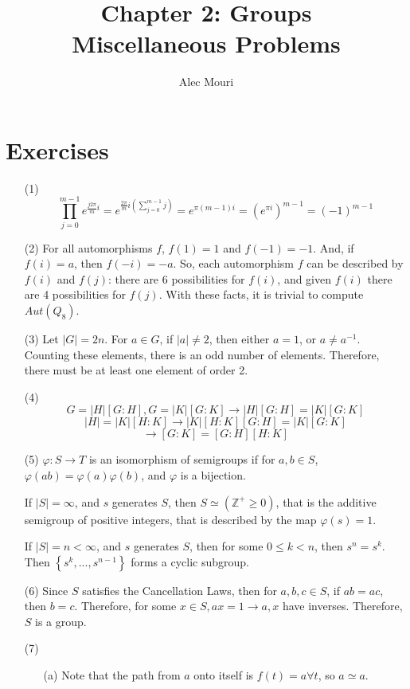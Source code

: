 \documentclass[12pt]{article}
\begin{document}
\title{Chapter 2: Groups \\ Miscellaneous Problems}
\author{Alec Mouri}

\maketitle
\section*{Exercises}
\begin{itemize}
\item[(1)]
$$\prod_{j = 0}^{m-1} e^{\frac{j2\pi}{m}i} = e^{\frac{2\pi}{m}i\left(\sum_{j=0}^{m-1}j\right)} = e^{\pi(m-1)i} = (e^{\pi i})^{m-1} = (-1)^{m-1}$$
\item[(2)]
For all automorphisms $f$, $f(1) = 1$ and $f(-1) = -1$. And, if $f(i) = a$, then $f(-i) = -a$. So, each automorphism $f$ can be described by $f(i)$ and $f(j)$: there are 6 possibilities for $f(i)$, and given $f(i)$ there are 4 possibilities for $f(j)$. With these facts, it is trivial to compute $Aut(Q_8)$.
\item[(3)]
Let $|G| = 2n$. For $a \in G$, if $|a| \neq 2$, then either $a = 1$, or $a \neq a^{-1}$. Counting these elements, there is an odd number of elements. Therefore, there must be at least one element of order 2.
\item[(4)]
$$G = |H|[G : H], G = |K|[G : K] \rightarrow |H|[G : H] = |K|[G : K]$$
$$|H| = |K|[H : K] \rightarrow |K|[H : K][G : H] = |K|[G : K]$$
$$\rightarrow [G : K] = [G : H][H : K]$$
\item[(5)]
$\varphi: S \rightarrow T$ is an isomorphism of semigroups if for $a, b \in S$, $\varphi(ab) = \varphi(a)\varphi(b)$, and $\varphi$ is a bijection.

If $|S| = \infty$, and $s$ generates $S$, then $S \simeq (\mathbb{Z}^+ \geq 0)$, that is the additive semigroup of positive integers, that is described by the map $\varphi(s) = 1$.

If $|S| = n < \infty$, and $s$ generates $S$, then for some $0 \leq k < n$, then $s^n = s^k$. Then $\left\lbrace s^k, ..., s^{n-1} \right\rbrace$ forms a cyclic subgroup.
\item[(6)]
Since $S$ satisfies the Cancellation Laws, then for $a, b, c \in S$, if $ab = ac$, then $b = c$. Therefore, for some $x \in S, ax = 1 \rightarrow a, x$ have inverses. Therefore, $S$ is a group.
\item[(7)]
\begin{itemize}
\item[(a)]
Note that the path from $a$ onto itself is $f(t) = a \forall t$, so $a \simeq a$.


\end{itemize}
\end{itemize}
\end{document}
